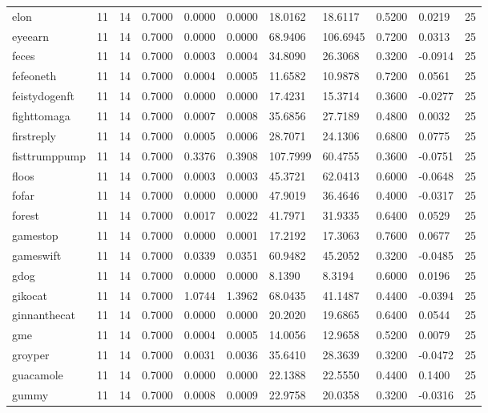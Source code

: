 \begin{table}[htbp]
\begin{tabular}{lllllllllll}
elon & 11 & 14 & 0.7000 & 0.0000 & 0.0000 & 18.0162 & 18.6117 & 0.5200 & 0.0219 & 25 \\
eyeearn & 11 & 14 & 0.7000 & 0.0000 & 0.0000 & 68.9406 & 106.6945 & 0.7200 & 0.0313 & 25 \\
feces & 11 & 14 & 0.7000 & 0.0003 & 0.0004 & 34.8090 & 26.3068 & 0.3200 & -0.0914 & 25 \\
fefeoneth & 11 & 14 & 0.7000 & 0.0004 & 0.0005 & 11.6582 & 10.9878 & 0.7200 & 0.0561 & 25 \\
feistydogenft & 11 & 14 & 0.7000 & 0.0000 & 0.0000 & 17.4231 & 15.3714 & 0.3600 & -0.0277 & 25 \\
fighttomaga & 11 & 14 & 0.7000 & 0.0007 & 0.0008 & 35.6856 & 27.7189 & 0.4800 & 0.0032 & 25 \\
firstreply & 11 & 14 & 0.7000 & 0.0005 & 0.0006 & 28.7071 & 24.1306 & 0.6800 & 0.0775 & 25 \\
fisttrumppump & 11 & 14 & 0.7000 & 0.3376 & 0.3908 & 107.7999 & 60.4755 & 0.3600 & -0.0751 & 25 \\
floos & 11 & 14 & 0.7000 & 0.0003 & 0.0003 & 45.3721 & 62.0413 & 0.6000 & -0.0648 & 25 \\
fofar & 11 & 14 & 0.7000 & 0.0000 & 0.0000 & 47.9019 & 36.4646 & 0.4000 & -0.0317 & 25 \\
forest & 11 & 14 & 0.7000 & 0.0017 & 0.0022 & 41.7971 & 31.9335 & 0.6400 & 0.0529 & 25 \\
gamestop & 11 & 14 & 0.7000 & 0.0000 & 0.0001 & 17.2192 & 17.3063 & 0.7600 & 0.0677 & 25 \\
gameswift & 11 & 14 & 0.7000 & 0.0339 & 0.0351 & 60.9482 & 45.2052 & 0.3200 & -0.0485 & 25 \\
gdog & 11 & 14 & 0.7000 & 0.0000 & 0.0000 & 8.1390 & 8.3194 & 0.6000 & 0.0196 & 25 \\
gikocat & 11 & 14 & 0.7000 & 1.0744 & 1.3962 & 68.0435 & 41.1487 & 0.4400 & -0.0394 & 25 \\
ginnanthecat & 11 & 14 & 0.7000 & 0.0000 & 0.0000 & 20.2020 & 19.6865 & 0.6400 & 0.0544 & 25 \\
gme & 11 & 14 & 0.7000 & 0.0004 & 0.0005 & 14.0056 & 12.9658 & 0.5200 & 0.0079 & 25 \\
groyper & 11 & 14 & 0.7000 & 0.0031 & 0.0036 & 35.6410 & 28.3639 & 0.3200 & -0.0472 & 25 \\
guacamole & 11 & 14 & 0.7000 & 0.0000 & 0.0000 & 22.1388 & 22.5550 & 0.4400 & 0.1400 & 25 \\
gummy & 11 & 14 & 0.7000 & 0.0008 & 0.0009 & 22.9758 & 20.0358 & 0.3200 & -0.0316 & 25 \\

\end{tabular}
\end{table}
